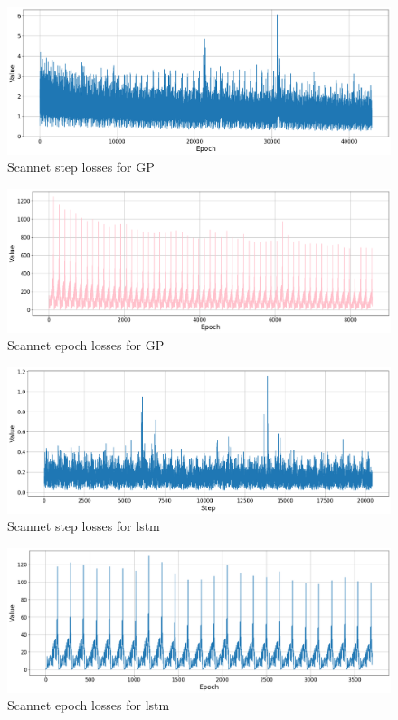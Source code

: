 	\begin{figure}
		\centering
		\includegraphics[width=13cm]{images/scannet_gp_step.png}
		\caption{Scannet step losses for GP}
		\label{fig:android_result}
	\end{figure}

	\begin{figure}
		\centering
		\includegraphics[width=13cm]{images/scannet_gp_epoch_all.png}
		\caption{Scannet epoch losses for GP}
		\label{fig:android_result}
	\end{figure}

	\begin{figure}
		\centering
		\includegraphics[width=13cm]{images/scannet_step_lstm.png}
		\caption{Scannet step losses for lstm}
		\label{fig:android_result}
	\end{figure}

	\begin{figure}
		\centering
		\includegraphics[width=13cm]{images/scannet_lstm_epoch_all.png}
		\caption{Scannet epoch losses for lstm}
		\label{fig:android_result}
	\end{figure}

